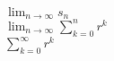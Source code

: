 \documentclass[border=6pt]{standalone}
\begin{document}
\parbox{2in}{$\displaystyle\lim_{n \to \infty} s_n$ \vspace{1ex}\\
$\displaystyle\lim_{n \to \infty} \displaystyle\sum_{k=0}^n r^k$ \vspace{1ex}\\
$\displaystyle\sum_{k=0}^\infty r^k$ \vspace{1ex}\\
}
\end{document}
